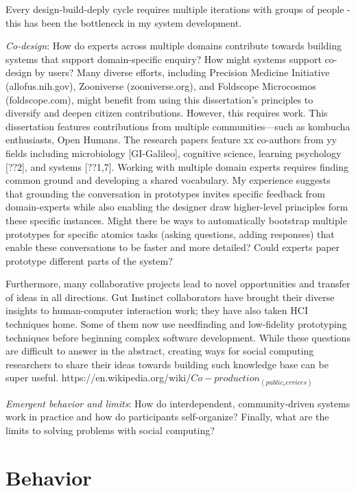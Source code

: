 Every design-build-deply cycle requires multiple iterations with groups of people - this has been the bottleneck in my system development. 

\textit{Co-design}: How do experts across multiple domains contribute towards building systems that support domain-specific enquiry? How might systems support co-design by users?
Many diverse efforts, including Precision Medicine Initiative (allofus.nih.gov), Zooniverse (zooniverse.org), and Foldscope Microcosmos (foldscope.com), might benefit from using this dissertation’s principles to diversify and deepen citizen contributions. However, this requires work. This dissertation features contributions from multiple communities—such as kombucha enthusiasts, Open Humans. The research papers feature xx co-authors from yy fields including microbiology [GI-Galileo], cognitive science, learning psychology [??2], and systems [??1,7]. Working with multiple domain experts requires finding common ground and developing a shared vocabulary. My experience suggests that grounding the conversation in prototypes invites specific feedback from domain-experts while also enabling the designer draw higher-level principles form these specific instances. Might there be ways to automatically bootstrap multiple prototypes for specific atomics tasks (asking questions, adding responses) that enable these conversations to be faster and more detailed? Could experts paper prototype different parts of the system?

Furthermore, many collaborative projects lead to novel opportunities and transfer of ideas in all directions. Gut Instinct collaborators have brought their diverse insights to human-computer interaction work; they have also taken HCI techniques home. Some of them now use needfinding and low-fidelity prototyping techniques before beginning complex software development. While these questions are difficult to answer in the abstract, creating ways for social computing researchers to share their ideas towards building such knowledge base can be super useful.    https://en.wikipedia.org/wiki/$Co-production_(public_services)$

\textit{Emergent behavior and limits}: How do interdependent, community-driven systems work in practice and how do participants self-organize? Finally, what are the limits to solving problems with social computing? 


\section{Behavior} 

